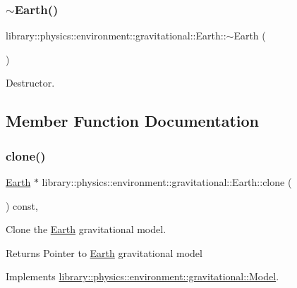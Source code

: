 \subsubsection{\texorpdfstring{$\sim$\+Earth()}{~Earth()}}
{\footnotesize\ttfamily library\+::physics\+::environment\+::gravitational\+::\+Earth\+::$\sim$\+Earth (\begin{DoxyParamCaption}{ }\end{DoxyParamCaption})}



Destructor. 



\subsection{Member Function Documentation}
\mbox{\label{classlibrary_1_1physics_1_1environment_1_1gravitational_1_1_earth_af49bd5f4dda5dc344a60240bfc7bc820}} 
\subsubsection{\texorpdfstring{clone()}{clone()}}
{\footnotesize\ttfamily \hyperlink{classlibrary_1_1physics_1_1environment_1_1gravitational_1_1_earth}{Earth} $\ast$ library\+::physics\+::environment\+::gravitational\+::\+Earth\+::clone (\begin{DoxyParamCaption}{ }\end{DoxyParamCaption}) const\hspace{0.3cm}{\ttfamily [override]}, {\ttfamily [virtual]}}



Clone the \hyperlink{classlibrary_1_1physics_1_1environment_1_1gravitational_1_1_earth}{Earth} gravitational model. 

\begin{DoxyReturn}{Returns}
Pointer to \hyperlink{classlibrary_1_1physics_1_1environment_1_1gravitational_1_1_earth}{Earth} gravitational model 
\end{DoxyReturn}


Implements \hyperlink{classlibrary_1_1physics_1_1environment_1_1gravitational_1_1_model_a5e75fe26d0635e2d97916ea0e7def842}{library\+::physics\+::environment\+::gravitational\+::\+Model}.

